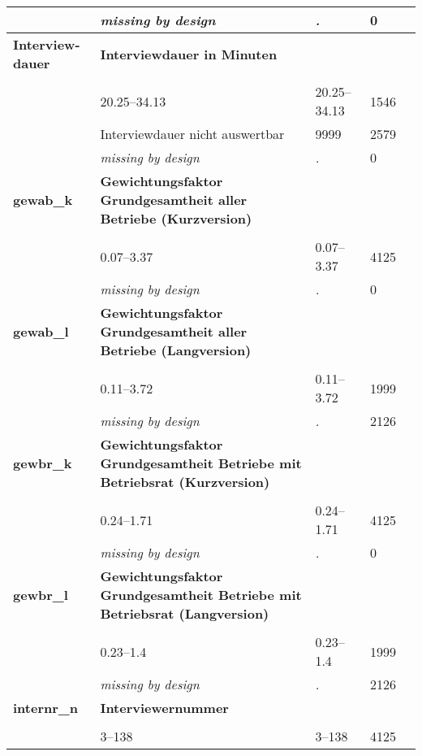 \begin{longtable}{| L{2.65cm} | L{8cm} | C{1.5cm} | R{1.25cm} | C{2.25cm}  |}
   & \textit{missing by design} & \textit{.} & 0 &  \\ 
   \midrule
\textbf{Interview-dauer}\label{var:Interviewdauer} & \textbf{Interviewdauer in Minuten} &  &  &  \\ 
   &  &  &  &  \\ 
   & 20.25--34.13 & 20.25--34.13 & 1546 &  \\ 
   & Interviewdauer nicht auswertbar & 9999 & 2579 &  \\ 
   & \textit{missing by design} & \textit{.} & 0 &  \\ 
   \midrule
\textbf{gewab\_k}\label{var:gewab:k} & \textbf{Gewichtungsfaktor Grundgesamtheit aller Betriebe (Kurzversion)} &  &  &  \\ 
   &  &  &  &  \\ 
   & 0.07--3.37 & 0.07--3.37 & 4125 &  \\ 
   & \textit{missing by design} & \textit{.} & 0 &  \\ 
   \midrule
\textbf{gewab\_l}\label{var:gewab:l} & \textbf{Gewichtungsfaktor Grundgesamtheit aller Betriebe (Langversion)} &  &  &  \\ 
   &  &  &  &  \\ 
   & 0.11--3.72 & 0.11--3.72 & 1999 &  \\ 
   & \textit{missing by design} & \textit{.} & 2126 &  \\ 
   \midrule
\textbf{gewbr\_k}\label{var:gewbr:k} & \textbf{Gewichtungsfaktor Grundgesamtheit Betriebe mit Betriebsrat (Kurzversion)} &  &  &  \\ 
   &  &  &  &  \\ 
   & 0.24--1.71 & 0.24--1.71 & 4125 &  \\ 
   & \textit{missing by design} & \textit{.} & 0 &  \\ 
   \midrule
\textbf{gewbr\_l}\label{var:gewbr:l} & \textbf{Gewichtungsfaktor Grundgesamtheit Betriebe mit Betriebsrat (Langversion)} &  &  &  \\ 
   &  &  &  &  \\ 
   & 0.23--1.4 & 0.23--1.4 & 1999 &  \\ 
   & \textit{missing by design} & \textit{.} & 2126 &  \\ 
   \midrule
\textbf{internr\_n}\label{var:internr:n} & \textbf{Interviewernummer} &  &  &  \\ 
   &  &  &  &  \\ 
   & 3--138 & 3--138 & 4125 &  \\ 

\end{longtable}
